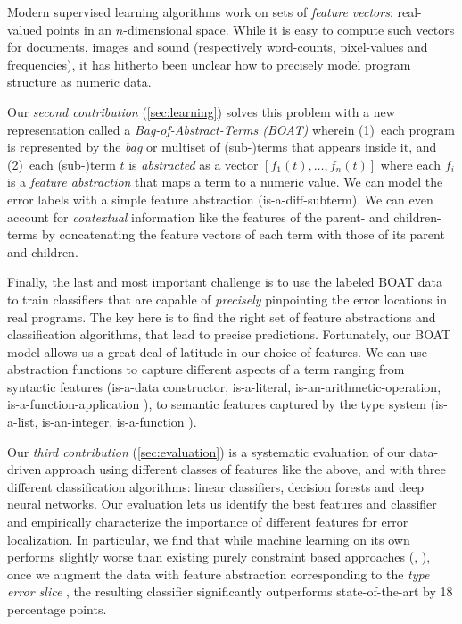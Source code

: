 %
Modern supervised learning algorithms work on sets of
\emph{feature vectors}: real-valued points in an
$n$-dimensional space. While it is easy to compute such
vectors for documents, images and sound (respectively
word-counts, pixel-values and frequencies), it has
hitherto been unclear how to precisely model program
structure as numeric data.

Our \emph{second contribution} (\autoref{sec:learning})
solves this problem with a new representation called
a \emph{Bag-of-Abstract-Terms (BOAT)} wherein
%
(1)~each program is represented by the \emph{bag}
    or multiset of (sub-)terms that appears inside
    it, and
%
(2)~each (sub-)term $t$ is \emph{abstracted} as
    a vector $[f_1(t), \ldots, f_n(t)]$ where
    each $f_i$ is a \emph{feature abstraction}
    that maps a term to a numeric value.
%
We can model the error labels with a simple feature
abstraction (\eg is-a-diff-subterm).
%
We can even account for \emph{contextual} information like
the features of the parent- and children- terms by
concatenating the feature vectors of each term with those
of its parent and children.

%
Finally, the last and most important challenge is to
use the labeled BOAT data to train classifiers that
are capable of \emph{precisely} pinpointing the error
locations in real programs.
%
The key here is to find the right set of feature
abstractions and classification algorithms, that
lead to precise predictions.
%
Fortunately, our BOAT model allows us a great deal of
latitude in our choice of features.
%
We can use abstraction functions to capture different
aspects of a term ranging from
%
syntactic features (\eg is-a-data constructor, is-a-literal,
is-an-arithmetic-operation, is-a-function-application \etc),
%
to semantic features captured by the type system (\eg is-a-list,
is-an-integer, is-a-function \etc).

Our \emph{third contribution} (\autoref{sec:evaluation})
is a systematic evaluation of our data-driven approach
using different classes of features like the above, and
with three different classification algorithms: linear
classifiers, decision forests and deep neural networks.
%
Our evaluation lets us identify the best features and
classifier and empirically characterize the importance
of different features for error localization.
%
In particular, we find that while machine learning
on its own performs slightly worse than existing
purely constraint based approaches (\eg \ocaml, \sherrloc),
once we augment the data with feature abstraction
corresponding to the \emph{type error slice} \cite{Tip2001-qp},
the resulting classifier significantly outperforms
state-of-the-art by 18 percentage points.

